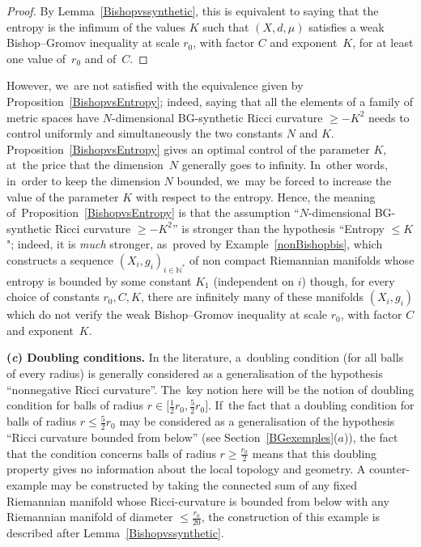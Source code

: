 \documentclass[10pt,a4paper]{amsart}
\numberwithin{equation}{section}
\newcommand{\N}{\mathbb{N}}
\begin{document}
\begin{proof}
By Lemma~\ref{Bishopvssynthetic}, this is equivalent to saying that the entropy is the infimum of the values $K$ such that $ (X,d, \mu) $ satisfies a weak
Bishop--Gromov inequality at scale $r_0$, with factor $C$ and exponent~$K$, for at least one value of~$r_0$ and of~$C$.
\end{proof}

However, we~are not satisfied with the equivalence given by Proposition~\ref{BishopvsEntropy}; indeed, saying that all the elements of a family of metric
spaces have $N$-dimensional BG-synthetic Ricci curvature \mbox{$\ge -K^2$} needs
to control uniformly and simultaneously the two constants $N$ and $K$.
Proposition~\ref{BishopvsEntropy} gives an optimal control of the parameter $K$, at~the price that the dimension~$N$ generally goes to infinity. In~other words, in~order to keep the dimension $N$ bounded, we~may be forced to increase the value of the parameter $K$ with respect to the entropy.
Hence, the meaning of~Proposition~\ref{BishopvsEntropy} is that the assumption ``$N$-dimensional BG-synthetic Ricci curvature $\ge -K^2$'' is
stronger than the hypothesis ``Entropy $\le K$"; indeed, it is \emph{much} stronger, as~proved by Example~\ref{nonBishopbis}, which constructs a
sequence $(X_i,g_i)_{i \in \N^*}$ of non compact Riemannian manifolds whose entropy is bounded by some constant $K_1$ (independent on $i$) though,
for every choice of constants $r_0, C, K$, there are infinitely many of these manifolds $(X_i, g_i)$ which do not verify the weak Bishop--Gromov inequality
at scale $r_0$, with factor $C$ and exponent~$K$.

\medskip\noindent
{\bf (\emph{c}) Doubling conditions.}
In the literature, a~doubling condition (for all balls of every radius) is generally considered as a generalisation of the hypothesis ``nonnegative
Ricci curvature''. The~key notion here will be the notion of doubling condition for balls of radius $r \in \big[ \frac{1}{2}r_0, \frac{5}{2} r_0\big]$. If~the fact
that a doubling condition for balls of radius $r\leq\frac{5}{2} r_0$ may be considered as a generalisation of the hypothesis ``Ricci curvature bounded from below'' (see Section~\ref{BGexemples}($a$)), the fact that the condition concerns balls of radius $r \ge\frac{r_0}{2}$ means that
this doubling property gives no information about the local topology and geometry. A counter-example may be constructed by taking the connected
sum of any fixed Riemannian manifold whose Ricci-curvature is bounded from below with any Riemannian manifold of diameter $\le \frac{r_0}{20}$, the construction of this example is described after Lemma~\ref{Bishopvssynthetic}.
\end{document}
